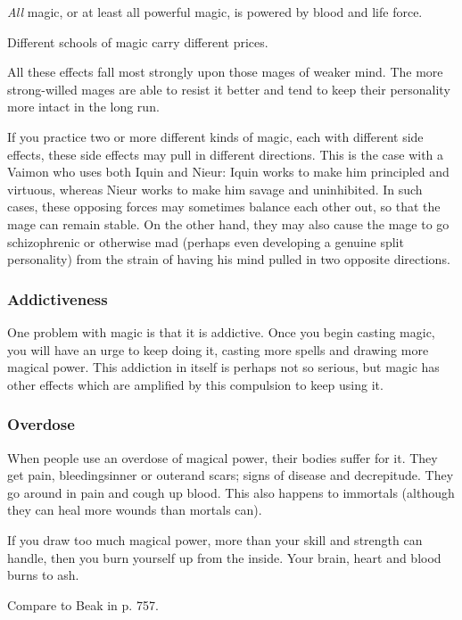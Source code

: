 \emph{All} magic, or at least all powerful magic, is powered by blood and life force. 

Different schools of magic carry different prices.

All these effects fall most strongly upon those mages of weaker mind. The more strong-willed mages are able to resist it better and tend to keep their personality more intact in the long run. 

If you practice two or more different kinds of magic, each with different side effects, these side effects may pull in different directions. This is the case with a Vaimon who uses both Iquin and Nieur: Iquin works to make him principled and virtuous, whereas Nieur works to make him savage and uninhibited. In such cases, these opposing forces may sometimes balance each other out, so that the mage can remain stable. On the other hand, they may also cause the mage to go schizophrenic or otherwise mad (perhaps even developing a genuine split personality) from the strain of having his mind pulled in two opposite directions. 






\subsubsection{Addictiveness}
One problem with magic is that it is addictive. Once you begin casting magic, you will have an urge to keep doing it, casting more spells and drawing more magical power. This addiction in itself is perhaps not so serious, but magic has other effects which are amplified by this compulsion to keep using it. 





\subsubsection{Overdose}
When people use an overdose of magical power, their bodies suffer for it.
They get pain, bleedings\dash{}inner or outer\dash{}and scars; signs of disease and decrepitude.
They go around in pain and cough up blood.
This also happens to immortals (although they can heal more wounds than mortals can).

If you draw too much magical power, more than your skill and strength can handle, then you burn yourself up from the inside. 
Your brain, heart and blood burns to ash.

Compare to Beak in \cite{StevenErikson:ReapersGale} p. 757. 





